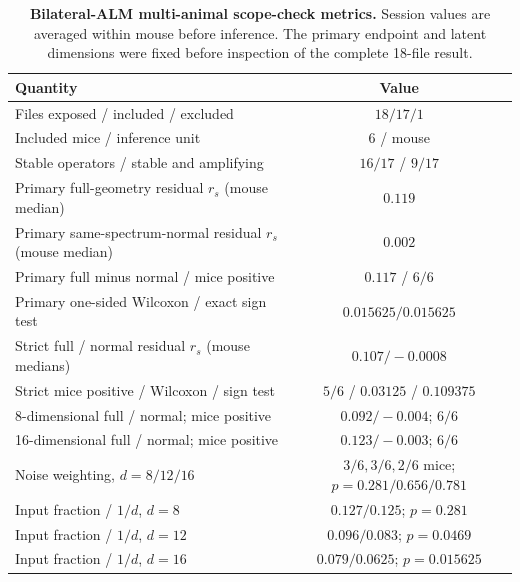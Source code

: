 \documentclass[
  aps,prl,preprint,notitlepage,superscriptaddress,nofootinbib,longbibliography,
  amsmath,amssymb
]{revtex4-2}
\begin{document}
\begin{table}[t]
\caption{\textbf{Bilateral-ALM multi-animal scope-check metrics.}
Session values are averaged within mouse before inference.  The primary
endpoint and latent dimensions were fixed before inspection of the complete
18-file result.}
\label{tab:s-alm}
\begin{scriptsize}
\begin{ruledtabular}
\begin{tabular}{lc}
Quantity & Value\\
\midrule
Files exposed / included / excluded & $18/17/1$\\
Included mice / inference unit & $6$ / mouse\\
Stable operators / stable and amplifying & $16/17$ / $9/17$\\
Primary full-geometry residual $r_s$ (mouse median) & $0.119$\\
Primary same-spectrum-normal residual $r_s$ (mouse median) & $0.002$\\
Primary full minus normal / mice positive & $0.117$ / $6/6$\\
Primary one-sided Wilcoxon / exact sign test & $0.015625/0.015625$\\
Strict full / normal residual $r_s$ (mouse medians) & $0.107/-0.0008$\\
Strict mice positive / Wilcoxon / sign test & $5/6$ / $0.03125$ / $0.109375$\\
8-dimensional full / normal; mice positive & $0.092/-0.004$; $6/6$\\
16-dimensional full / normal; mice positive & $0.123/-0.003$; $6/6$\\
Noise weighting, $d=8/12/16$ &
$3/6,3/6,2/6$ mice; $p=0.281/0.656/0.781$\\
Input fraction / $1/d$, $d=8$ & $0.127/0.125$; $p=0.281$\\
Input fraction / $1/d$, $d=12$ & $0.096/0.083$; $p=0.0469$\\
Input fraction / $1/d$, $d=16$ & $0.079/0.0625$; $p=0.015625$\\
\end{tabular}
\end{ruledtabular}
\end{scriptsize}
\end{table}
\end{document}
